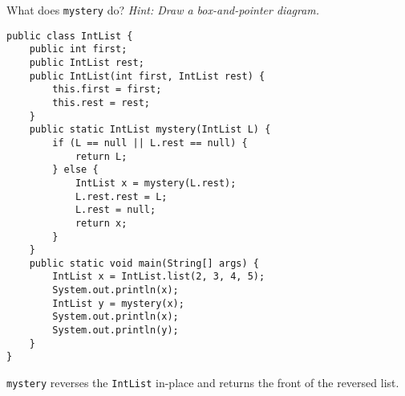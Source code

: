 \question What does \texttt{mystery} do? \textit{Hint: Draw a box-and-pointer diagram.}

\begin{lstlisting}
public class IntList {
    public int first;
    public IntList rest;
    public IntList(int first, IntList rest) {
        this.first = first;
        this.rest = rest;
    }
    public static IntList mystery(IntList L) {
        if (L == null || L.rest == null) {
            return L;
        } else {
            IntList x = mystery(L.rest);
            L.rest.rest = L;
            L.rest = null;
            return x;
        }
    }
    public static void main(String[] args) {
        IntList x = IntList.list(2, 3, 4, 5);
        System.out.println(x);
        IntList y = mystery(x);
        System.out.println(x);
        System.out.println(y);
    }
}
\end{lstlisting}

\begin{solution}
\texttt{mystery} reverses the \texttt{IntList} in-place and returns the front of the reversed list.
\end{solution}